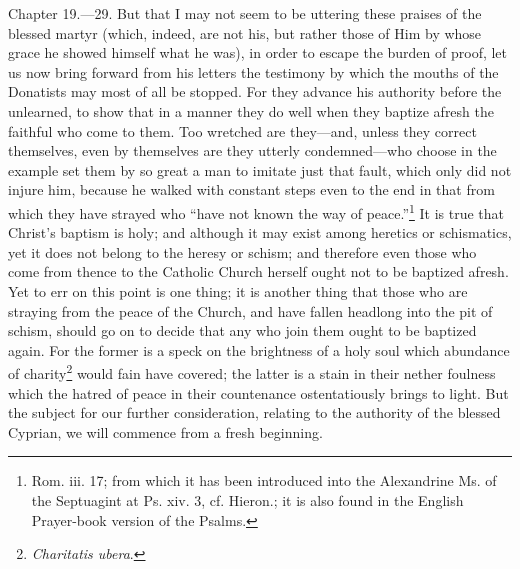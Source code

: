 Chapter 19.—29. But that I may not seem to be uttering these praises of the blessed martyr (which, indeed, are not his, but rather those of Him by whose grace he showed himself what he was), in order to escape the burden of proof, let us now bring forward from his letters the testimony by which the mouths of the Donatists may most of all be stopped. For they advance his authority before the unlearned, to show that in a manner they do well when they baptize afresh the faithful who come to them. Too wretched are they—and, unless they correct themselves, even by themselves are they utterly condemned—who choose in the example set them by so great a man to imitate just that fault, which only did not injure him, because he walked with constant steps even to the end in that from which they have strayed who ``have not known the way of peace.''\footnote{\par  Rom. iii. 17; from which it has been introduced into the Alexandrine  Ms. of the Septuagint at Ps. xiv. 3, cf. Hieron.; it is also found in the English Prayer-book version of the Psalms.} It is true that Christ’s baptism is holy; and although it may exist among heretics or schismatics, yet it does not belong to the heresy or schism; and therefore even those who come from thence to the Catholic Church herself ought not to be baptized afresh. Yet to err on this point is one thing; it is another thing that those who are straying from the peace of the Church, and have fallen headlong into the pit of schism, should go on to decide that any who join them ought to be baptized again. For the former is a speck on the brightness of a holy soul which abundance of charity\footnote{\par  \emph{Charitatis ubera}.} would fain have covered; the latter is a stain in their nether foulness which the hatred of peace in their countenance ostentatiously brings to light. But the subject for our further consideration, relating to the authority of the blessed Cyprian, we will commence from a fresh beginning.


